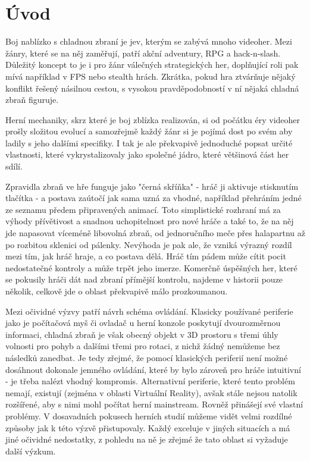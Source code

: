 \chapter*{Úvod}

Boj nablízko s chladnou zbraní je jev, kterým se zabývá mnoho videoher. Mezi žánry, které se na něj zaměřují, patří akční adventury, RPG a hack-n-slash. Důležitý koncept to je i pro žánr válečných strategických her, doplňující roli pak mívá například v FPS nebo stealth hrách. Zkrátka, pokud hra ztvárňuje nějaký konflikt řešený násilnou cestou, s vysokou pravděpodobností v ní nějaká chladná zbraň figuruje.

Herní mechaniky, skrz které je boj zblízka realizován, si od počátku éry videoher prošly složitou evolucí a samozřejmě každý žánr si je pojímá dost po svém aby ladily s jeho dalšími specifiky. I tak je ale překvapivě jednoduché popsat určité vlastnosti, které vykrystalizovaly jako společné jádro, které většinová část her sdílí.

Zpravidla zbraň ve hře funguje jako "černá skříňka" - hráč ji aktivuje stisknutím tlačítka - a postava zaútočí jak sama uzná za vhodné, například přehráním jedné ze seznamu předem připravených animací. Toto simplistické rozhraní má za výhody přívětivost a snadnou uchopitelnost pro nové hráče a také to, že na něj jde napasovat víceméně libovolná zbraň, od jednoručního meče přes halapartnu až po rozbitou sklenici od pálenky. Nevýhoda je pak ale, že vzniká výrazný rozdíl mezi tím, jak hráč hraje, a co postava dělá. Hráč tím pádem může cítit pocit nedostatečné kontroly a může trpět jeho imerze. Komerčně úspěšných her, které se pokusily hráči dát nad zbraní přímější kontrolu, najdeme v historii pouze několik, celkově jde o oblast překvapivě málo prozkoumanou. 
  
Mezi očividné výzvy patří návrh schéma ovládání.  Klasicky používané periferie jako je počítačová myš či ovladač u herní konzole poskytují dvourozměrnou informaci, chladná zbraň je však obecný objekt v 3D prostoru s třemi úhly volnosti pro pohyb a dalšími třemi pro rotaci, z nichž žádný nemůžeme bez následků zanedbat. Je tedy zřejmé, že pomocí klasických periferií není možné dosáhnout dokonale jemného ovládání, které by bylo zároveň pro hráče intuitivní - je třeba nalézt vhodný kompromis. Alternativní periferie, které tento problém nemají, existují (zejména v oblasti Virtuální Reality), avšak stále nejsou natolik rozšířené, aby s nimi mohl počítat herní mainstream. Rovněž přinášejí své vlastní problémy. V dosavadních pokusech herních studií můžeme vidět velmi rozdílné způsoby jak k této výzvě přistupovaly. Každý exceluje v jiných situacích a má jiné očividné nedostatky, z pohledu na ně je zřejmé že tato oblast si vyžaduje další výzkum. 
 
